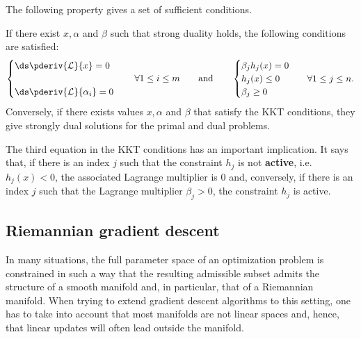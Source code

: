     The following property gives a set of sufficient conditions.
    \begin{property}\label{data:kkt}
        If there exist $x,\alpha$ and $\beta$ such that strong duality holds, the following conditions are satisfied:
        \begin{align}
            \begin{cases}
                \ds\pderiv{\mathcal{L}}{x}=0\\
                \\
                \ds\pderiv{\mathcal{L}}{\alpha_i}=0
            \end{cases}
            \quad\forall1\leq i\leq m \qquad\text{and}\qquad
            \begin{cases}
                \beta_jh_j(x)=0\\
                h_j(x)\leq0&\quad\forall1\leq j\leq n.\\
                \beta_j\geq0
            \end{cases}
        \end{align}
        Conversely, if there exists values $x,\alpha$ and $\beta$ that satisfy the KKT conditions, they give strongly dual solutions for the primal and dual problems.
    \end{property}
    \begin{remark}\label{data:slackness}
        The third equation in the KKT conditions has an important implication. It says that, if there is an index $j$ such that the constraint $h_j$ is not \textbf{active}, i.e.~$h_j(x)<0$, the associated Lagrange multiplier is 0 and, conversely, if there is an index $j$ such that the Lagrange multiplier $\beta_j>0$, the constraint $h_j$ is active.
    \end{remark}


\subsection{Riemannian gradient descent}

    In many situations, the full parameter space of an optimization problem is constrained in such a way that the resulting admissible subset admits the structure of a smooth manifold and, in particular, that of a Riemannian manifold. When trying to extend gradient descent algorithms to this setting, one has to take into account that most manifolds are not linear spaces and, hence, that linear updates will often lead outside the manifold.

